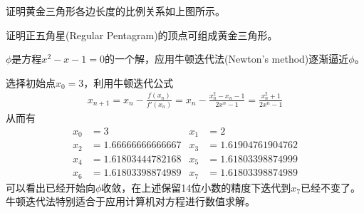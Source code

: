 \begin{question}
  证明黄金三角形各边长度的比例关系如上图所示。
\end{question}

\begin{question}
  证明正五角星(Regular Pentagram)的顶点可组成黄金三角形。
  \begin{center}
  \end{center}
\end{question}

\begin{example}[数值逼近]
  $\phi$是方程$x^2-x-1=0$的一个解，应用牛顿迭代法(Newton's method)逐渐逼近$\phi$。
\end{example}

选择初始点$x_0=3$，利用牛顿迭代公式
\begin{align*}
  x_{n+1}=x_n-\frac{f(x_n)}{f'(x_n)}=x_n-\frac{x_n^2-x_n-1}{2x^n-1}=\frac{x_n^2+1}{2x^n-1}
\end{align*}
从而有
\begin{align*}
  x_0&=3 &
  x_1&=2\\
  x_2&=1.66666666666667 &
  x_3&=1.61904761904762\\
  x_4&=1.61803444782168 &
  x_5&=1.61803398874999\\
  x_6&=1.61803398874989 &
  x_7&=1.61803398874989
\end{align*}
可以看出已经开始向$\phi$收敛，在上述保留14位小数的精度下迭代到$x_7$已经不变了。牛顿迭代法特别适合于应用计算机对方程进行数值求解。